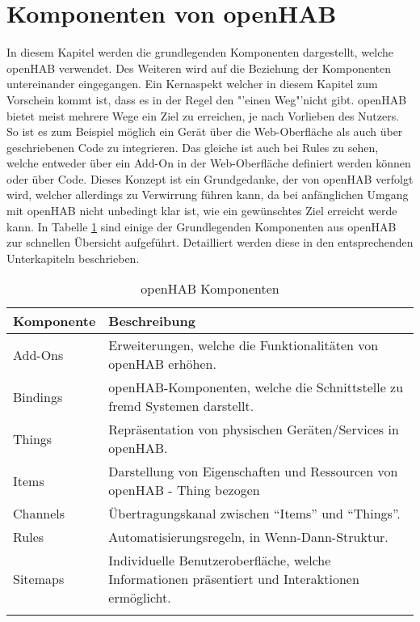 \section{Komponenten von openHAB}\label{sec:technischeSicht}
In diesem Kapitel werden die grundlegenden Komponenten dargestellt, welche openHAB verwendet. Des Weiteren wird auf die  Beziehung der Komponenten untereinander eingegangen.
Ein Kernaspekt welcher in diesem Kapitel zum Vorschein kommt ist, dass es in der Regel den "'einen Weg"'nicht gibt. openHAB bietet meist mehrere Wege ein Ziel zu erreichen, je nach Vorlieben des Nutzers. So ist es zum Beispiel möglich ein Gerät über die Web-Oberfläche als auch über geschriebenen Code zu integrieren. Das gleiche ist auch bei Rules zu sehen, welche entweder über ein Add-On in der Web-Oberfläche definiert werden können oder über Code. Dieses Konzept ist ein Grundgedanke, der von openHAB verfolgt wird, welcher allerdings zu Verwirrung führen kann, da bei anfänglichen Umgang mit openHAB nicht unbedingt klar ist, wie ein gewünschtes Ziel erreicht werde kann.
In Tabelle \ref{table:openhub-components} sind einige der Grundlegenden Komponenten aus openHAB zur schnellen Übersicht aufgeführt. Detailliert werden diese in den entsprechenden Unterkapiteln beschrieben.

\begin{longtable}{| p{4cm} | p{11cm}|}
	\hline
	\textbf{Komponente} & \textbf{Beschreibung} \\
	\hline \hline
	\centering Add-Ons & Erweiterungen, welche die Funktionalitäten von openHAB erhöhen. \\
	\hline
	\centering Bindings & openHAB-Komponenten, welche die Schnittstelle zu fremd Systemen darstellt.  \\
	\hline
	\centering Things & Repräsentation von physischen Geräten/Services in openHAB. \\
	\hline
	\centering Items & Darstellung von Eigenschaften und Ressourcen von openHAB - Thing bezogen \\
	\hline
	\centering Channels & Übertragungskanal zwischen "`Items"' und "`Things"'. \\
	\hline
	\centering Rules & Automatisierungsregeln, in Wenn-Dann-Struktur.\\
	\hline
	\centering Sitemaps & Individuelle Benutzeroberfläche, welche Informationen präsentiert und Interaktionen ermöglicht.\\
	\hline
	\caption{openHAB Komponenten}
	\label{table:openhub-components}
\end{longtable}

